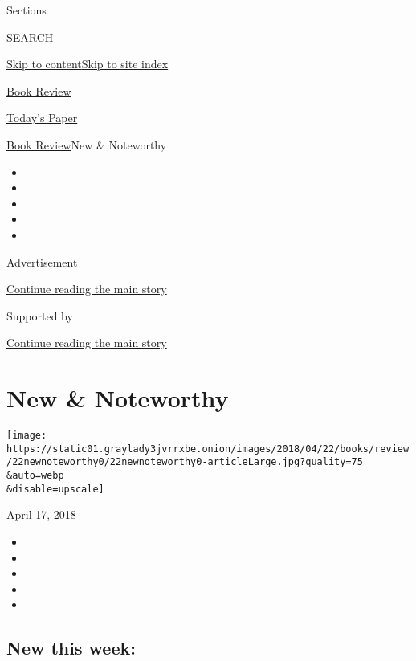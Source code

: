 Sections

SEARCH

\protect\hyperlink{site-content}{Skip to
content}\protect\hyperlink{site-index}{Skip to site index}

\href{https://www.nytimes3xbfgragh.onion/section/books/review}{Book
Review}

\href{https://myaccount.nytimes3xbfgragh.onion/auth/login?response_type=cookie\&client_id=vi}{}

\href{https://www.nytimes3xbfgragh.onion/section/todayspaper}{Today's
Paper}

\href{/section/books/review}{Book Review}\textbar{}New \& Noteworthy

\begin{itemize}
\item
\item
\item
\item
\item
\end{itemize}

Advertisement

\protect\hyperlink{after-top}{Continue reading the main story}

Supported by

\protect\hyperlink{after-sponsor}{Continue reading the main story}

\hypertarget{new--noteworthy}{%
\section{New \& Noteworthy}\label{new--noteworthy}}

\texttt{[image: https://static01.graylady3jvrrxbe.onion/images/2018/04/22/books/review/22newnoteworthy0/22newnoteworthy0-articleLarge.jpg?quality=75\\\&auto=webp\\\&disable=upscale]}

April 17, 2018

\begin{itemize}
\item
\item
\item
\item
\item
\end{itemize}

\hypertarget{new-this-week}{%
\subsection{New this week:}\label{new-this-week}}

